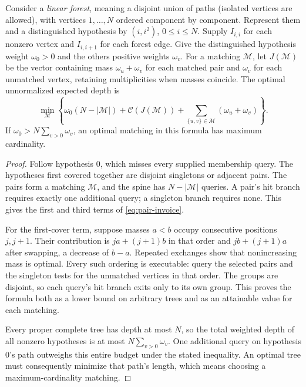 \begin{lemma}\label{lem:pair-invoice}
Consider a \emph{linear forest}, meaning a disjoint union of paths
(isolated vertices are allowed), with vertices $1,\ldots,N$ ordered
component by component. Represent them and a distinguished hypothesis by
$(i,i^2)$, $0\le i\le N$. Supply $I_{i,i}$ for each nonzero vertex
and $I_{i,i+1}$ for each forest edge.
Give the distinguished hypothesis weight $\omega_0>0$ and the
others positive weights $\omega_v$.
For a matching $\mathcal M$, let $J(\mathcal M)$ be the vector
containing mass
$\omega_u+\omega_v$ for each matched pair and $\omega_v$ for each
unmatched vertex, retaining multiplicities when masses coincide.
The optimal unnormalized expected depth is
\begin{equation}\label{eq:pair-invoice}
 \min_{\mathcal M}
 \left\{\omega_0(N-|\mathcal M|)
       +\mathcal C(J(\mathcal M))
       +\sum_{\{u,v\}\in\mathcal M}(\omega_u+\omega_v)\right\}.
\end{equation}
If $\omega_0>N\sum_{v>0}\omega_v$, an optimal matching in this
formula has maximum cardinality.
\end{lemma}
\begin{proof}
Follow hypothesis $0$, which misses every supplied membership query.
The hypotheses first covered together are disjoint singletons
or adjacent pairs. The pairs form a matching $\mathcal M$,
and the spine has $N-|\mathcal M|$ queries.
A pair's hit branch requires exactly one additional query;
a singleton branch requires none.
This gives the first and third terms of \eqref{eq:pair-invoice}.

For the first-cover term, suppose masses $a<b$ occupy consecutive
positions $j,j+1$. Their contribution is
$ja+(j+1)b$ in that order and $jb+(j+1)a$ after swapping, a decrease
of $b-a$. Repeated exchanges show that nonincreasing mass is optimal.
Every such ordering is executable: query the selected pairs
and the singleton tests for the unmatched vertices in that order.
The groups are disjoint, so each query's hit branch exits only
to its own group. This proves the
formula both as a lower bound on arbitrary trees and as an
attainable value for each matching.

Every proper complete tree has depth at most $N$, so the total
weighted depth of all nonzero hypotheses is at most
$N\sum_{v>0}\omega_v$. One additional query on hypothesis $0$'s
path outweighs this entire budget under the stated inequality.
An optimal tree must consequently minimize that path's length,
which means choosing a maximum-cardinality matching.
\end{proof}

